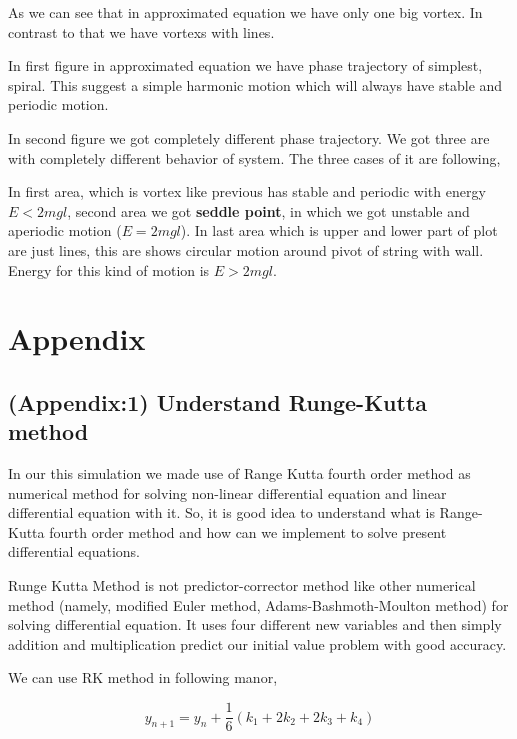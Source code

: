 \documentclass[11pt,a4paper]{article}
\begin{document}
As we can see that in approximated equation we have only one big vortex. In contrast to that we have vortexs with lines.

In first figure in approximated equation we have phase trajectory of simplest, spiral. This suggest a simple harmonic motion which will always have stable and periodic motion.

In second figure we got completely different phase trajectory. We got three are with completely different behavior of system. The three cases of it are following,

In first area, which is vortex like previous has stable and periodic with energy \(E<2mgl\), second area we got \textbf{seddle point}, in which we got unstable and aperiodic motion (\(E=2mgl\)). In last area which is upper and lower part of plot are just lines, this are shows circular motion around pivot of string with wall. Energy for this kind of motion is \(E>2mgl\).




\pagebreak



\section{Appendix}
\label{sec:org84bf6b4}

\subsection{(Appendix:1) Understand Runge-Kutta method}
\label{sec:orga012e06}

In our this simulation we made use of Range Kutta fourth order method as numerical method for solving non-linear differential equation and linear differential equation with it. So, it is good idea to understand what is Range-Kutta fourth order method and how can we implement to solve present differential equations.

Runge Kutta Method is not predictor-corrector method like other numerical method (namely, modified Euler method, Adams-Bashmoth-Moulton method) for solving differential equation. It uses four different new variables and then simply addition and multiplication predict our initial value problem with good accuracy.

We can use RK method in following manor,

\begin{equation*}
y_{n+1} = y_{n}+\frac{1}{6}(k_{1}+2k_{2}+2k_{3}+k_{4})
\end{equation*}
\end{document}
